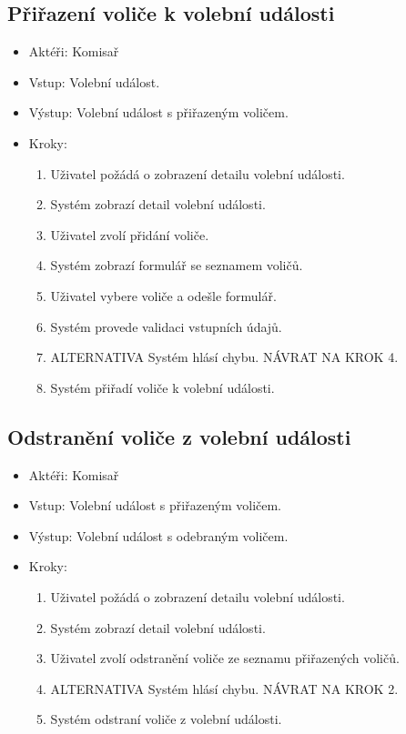 \documentclass[11pt,twoside,a4paper]{book}
\begin{document}
\subsection{Přiřazení voliče k volební události}

\begin{itemize}
\item Aktéři: Komisař
\item Vstup: Volební událost.
\item Výstup: Volební událost s přiřazeným voličem.
\item Kroky:
	\begin{enumerate}
		\item Uživatel požádá o zobrazení detailu volební události.
		\item Systém zobrazí detail volební události.
		\item Uživatel zvolí přidání voliče.
		\item Systém zobrazí formulář se seznamem voličů.
		\item Uživatel vybere voliče a odešle formulář.
		\item Systém provede validaci vstupních údajů.
		\item ALTERNATIVA Systém hlásí chybu. NÁVRAT NA KROK 4.
		\item Systém přiřadí voliče k volební události.
	\end{enumerate}
\end{itemize}

\subsection{Odstranění voliče z volební události}

\begin{itemize}
\item Aktéři: Komisař
\item Vstup: Volební událost s přiřazeným voličem.
\item Výstup: Volební událost s odebraným voličem.
\item Kroky:
	\begin{enumerate}
		\item Uživatel požádá o zobrazení detailu volební události.
		\item Systém zobrazí detail volební události.
		\item Uživatel zvolí odstranění voliče ze seznamu přiřazených voličů.		
		\item ALTERNATIVA Systém hlásí chybu. NÁVRAT NA KROK 2.
		\item Systém odstraní voliče z volební události.
	\end{enumerate}
\end{itemize}
\end{document}
